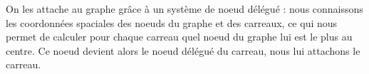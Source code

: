 On les attache au graphe grâce à un système de noeud délégué : nous connaissons les coordonnées spaciales des noeuds du graphe et des carreaux, ce qui nous permet de calculer pour chaque carreau quel noeud du graphe lui est le plus au centre. Ce noeud devient alors le noeud délégué du carreau, nous lui attachons le carreau.




    


